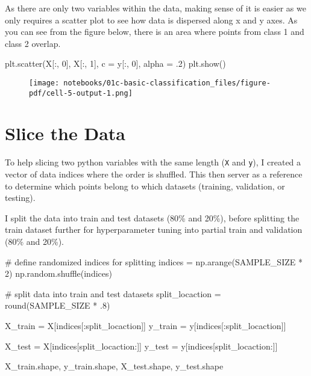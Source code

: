 \documentclass[
  letterpaper,
  DIV=11,
  numbers=noendperiod]{scrreprt}
\newenvironment{Shaded}{\begin{snugshade}}{\end{snugshade}}
\newcommand{\BuiltInTok}[1]{\textcolor[rgb]{0.00,0.23,0.31}{#1}}
\newcommand{\CommentTok}[1]{\textcolor[rgb]{0.37,0.37,0.37}{#1}}
\newcommand{\DecValTok}[1]{\textcolor[rgb]{0.68,0.00,0.00}{#1}}
\newcommand{\FloatTok}[1]{\textcolor[rgb]{0.68,0.00,0.00}{#1}}
\newcommand{\NormalTok}[1]{\textcolor[rgb]{0.00,0.23,0.31}{#1}}
\newcommand{\OperatorTok}[1]{\textcolor[rgb]{0.37,0.37,0.37}{#1}}
\begin{document}
As there are only two variables within the data, making sense of it is
easier as we only requires a scatter plot to see how data is dispersed
along x and y axes. As you can see from the figure below, there is an
area where points from class 1 and class 2 overlap.

\begin{Shaded}
\begin{Highlighting}[]
\NormalTok{plt.scatter(X[:, }\DecValTok{0}\NormalTok{], X[:, }\DecValTok{1}\NormalTok{], c }\OperatorTok{=}\NormalTok{ y[:, }\DecValTok{0}\NormalTok{], alpha }\OperatorTok{=} \FloatTok{.2}\NormalTok{)}
\NormalTok{plt.show()}
\end{Highlighting}
\end{Shaded}

\begin{figure}[H]

{\centering \texttt{[image: notebooks/01c-basic-classification\_files/figure-pdf/cell-5-output-1.png]}

}

\end{figure}

\hypertarget{slice-the-data}{%
\section{Slice the Data}\label{slice-the-data}}

To help slicing two python variables with the same length (\texttt{X}
and \texttt{y}), I created a vector of data indices where the order is
shuffled. This then server as a reference to determine which points
belong to which datasets (training, validation, or testing).

I split the data into train and test datasets (80\% and 20\%), before
splitting the train dataset further for hyperparameter tuning into
partial train and validation (80\% and 20\%).

\begin{Shaded}
\begin{Highlighting}[]
\CommentTok{\# define randomized indices for splitting}
\NormalTok{indices }\OperatorTok{=}\NormalTok{ np.arange(SAMPLE\_SIZE }\OperatorTok{*} \DecValTok{2}\NormalTok{)}
\NormalTok{np.random.shuffle(indices)}

\CommentTok{\# split data into \textasciigrave{}train\textasciigrave{} and \textasciigrave{}test datasets\textasciigrave{}}
\NormalTok{split\_locaction }\OperatorTok{=} \BuiltInTok{round}\NormalTok{(SAMPLE\_SIZE }\OperatorTok{*} \FloatTok{.8}\NormalTok{)}

\NormalTok{X\_train }\OperatorTok{=}\NormalTok{ X[indices[:split\_locaction]]}
\NormalTok{y\_train }\OperatorTok{=}\NormalTok{ y[indices[:split\_locaction]]}

\NormalTok{X\_test }\OperatorTok{=}\NormalTok{ X[indices[split\_locaction:]]}
\NormalTok{y\_test }\OperatorTok{=}\NormalTok{ y[indices[split\_locaction:]]}

\NormalTok{X\_train.shape, y\_train.shape, X\_test.shape, y\_test.shape}
\end{Highlighting}
\end{Shaded}
\end{document}
